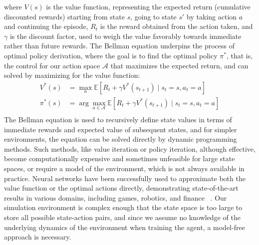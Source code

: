 where $V(s)$ is the value function, representing the expected return (cumulative discounted rewards) starting from state $s$,
going to state $s'$ by taking action $a$ and continuing the episode, $R_t$ is the reward obtained from the action taken,
and $\gamma$ is the discount factor, used to weigh the value favorably towards immediate rather than future rewards.
The Bellman equation underpins the process of optimal policy derivation, where the goal is to find the optimal policy $\pi^*$,
that is, the control for our action space $\mathcal{A}$ that maximizes the expected return,
and can solved by maximizing for the value function:
\begin{equation*}
    \begin{aligned}
        V^*(s) &= \max_a \mathbb{E} \left[ R_t + \gamma V^*(s_{t+1}) \mid s_t = s, a_t = a \right]\\
        \pi^*(s) &= \arg \max_{a \in \mathcal{A}} \mathbb{E} \left[ R_t + \gamma V^*(s_{t+1}) \mid s_t = s, a_t = a \right]\\
    \end{aligned}
\end{equation*}
The Bellman equation is used to recursively define state values in terms of immediate rewards and expected value of subsequent states,
and for simpler environments, the equation can be solved directly by dynamic programming methods.
Such methods, like value iteration or policy iteration, although effective, become computationally expensive and sometimes unfeasible for large state spaces,
or require a model of the environment, which is not always available in practice.
Neural networks have been successfully used to approximate both the value function or the optimal actions directly,
demonstrating state-of-the-art results in various domains, including games, robotics, and finance
~\cite{He2023, Bakshaev2020, Patel2018, Ganesh2019, Sun2022, Gasperov2021a}.
Our simulation environment is complex enough that the state space is too large to store all possible state-action pairs,
and since we assume no knowledge of the underlying dynamics of the environment when training the agent, a model-free approach is necessary.

